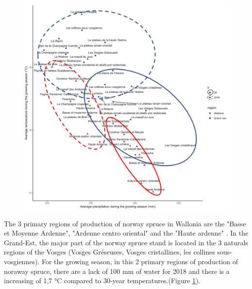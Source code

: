 \documentclass[3p,procedia]{elsarticle}
\begin{document}
\begin{figure}
	\centering
	\includegraphics[width=\textwidth]{clim_region_nat_GE_Wal_en.jpg}
	\caption{	}
	
	\label{fig:clim}
\end{figure}
The 3 primary regions of production of norway spruce in Wallonia are the "Basse et Moyenne Ardenne", "Ardenne centro oriental" and the "Haute ardenne" \citep{van_der_perre_carte_2015}. In the Grand-Est, the major part of the norway spruce stand is located in the 3 naturals regions of the Vosges (Vosges Gréseuses, Vosges cristallines, les collines sous-vosgiennes). For the growing season, in this 2 primary regions of production of noraway spruce, there are a lack of 100 mm of water for 2018 and there is a increasing of 1,7 °C compared to 30-year temperatures.(Figure \ref{fig:clim}). 




	
\end{document}

